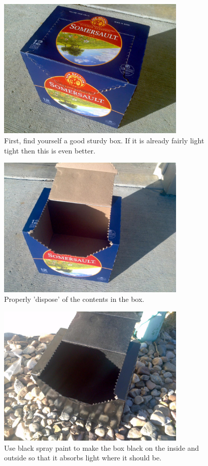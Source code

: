 \documentclass[13pt]{article}
\begin{document}
\begin{figure}[ht!]
\centering
\includegraphics[width=0.8\textwidth]{eps/fullBox.eps}
\caption{First, find yourself a good sturdy box. If it is already fairly light tight then this is even better.
	 \label{fig:fullBox}} 
\end{figure}

\begin{figure}[ht!]
\centering
\includegraphics[width=0.8\textwidth]{eps/emptyBox.eps}
\caption{Properly 'dispose' of the contents in the box.
	 \label{fig:emptyBox}} 
\end{figure}

\begin{figure}[ht!]
\centering
\includegraphics[width=0.8\textwidth]{eps/blackBox.eps}
\caption{Use black spray paint to make the box black on the inside and outside so that it absorbs light where it should be.
	 \label{fig:blackBox}} 
\end{figure}
\end{document}
